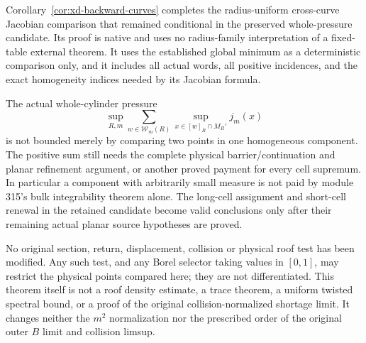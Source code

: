 \begin{remark}
\label{rem:xd-pressure-scope}
Corollary~\ref{cor:xd-backward-curves} completes the radius-uniform
cross-curve Jacobian comparison that remained conditional in the
preserved whole-pressure candidate.  Its proof is native and uses
no radius-family interpretation of a fixed-table external theorem.
It uses the established global minimum as a deterministic comparison
only, and it includes all actual words, all positive incidences,
and the exact homogeneity indices needed by its Jacobian formula.

The actual whole-cylinder pressure
\[
 \sup_{R,m}\sum_{w\in\mathcal W_m(R)}
                  \sup_{x\in[w]_R\cap M_R'}j_m(x)
\]
is not bounded merely by comparing two points in one homogeneous
component.  The positive sum still needs the complete physical
barrier/continuation and planar refinement argument, or another
proved payment for every cell supremum.  In particular a component
with arbitrarily small measure is not paid by module 315's bulk
integrability theorem alone.  The long-cell assignment and short-cell
renewal in the retained candidate become valid conclusions only
after their remaining actual planar source hypotheses are proved.

No original section, return, displacement, collision or physical roof
test has been modified.  Any such test, and any Borel selector taking
values in $[0,1]$, may restrict the physical points compared here;
they are not differentiated.  This theorem itself is not a roof
density estimate, a trace theorem, a uniform twisted spectral bound,
or a proof of the original collision-normalized shortage limit.
It changes neither the $m^2$ normalization nor the prescribed order
of the original outer $B$ limit and collision limsup.
\end{remark}
